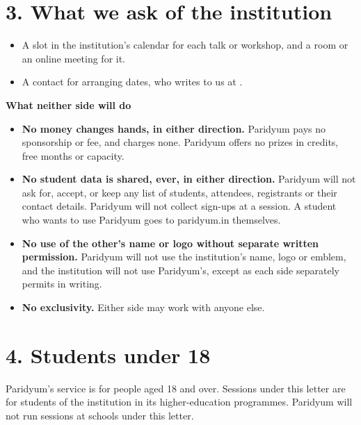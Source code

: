 \documentclass{paridyum}
\begin{document}
\section*{3. What we ask of the institution}
\begin{itemize}[leftmargin=*, noitemsep]
    \item A slot in the institution's calendar for each talk or workshop, and a room or an online
          meeting for it.
    \item A contact for arranging dates, who writes to us at \dkOrgEmail.
\end{itemize}

\vspace{0.5em}
\begin{infobox}
\textbf{What neither side will do}\\[0.5em]
\begin{itemize}[leftmargin=*, noitemsep]
    \item \textbf{No money changes hands, in either direction.} Paridyum pays no sponsorship or
          fee, and charges none. Paridyum offers no prizes in credits, free months or capacity.
    \item \textbf{No student data is shared, ever, in either direction.} Paridyum will not ask
          for, accept, or keep any list of students, attendees, registrants or their contact
          details. Paridyum will not collect sign-ups at a session. A student who wants to use
          Paridyum goes to paridyum.in themselves.
    \item \textbf{No use of the other's name or logo without separate written permission.}
          Paridyum will not use the institution's name, logo or emblem, and the institution will
          not use Paridyum's, except as each side separately permits in writing.
    \item \textbf{No exclusivity.} Either side may work with anyone else.
\end{itemize}
\end{infobox}

\section*{4. Students under 18}
Paridyum's service is for people aged 18 and over. Sessions under this letter are for students
of the institution in its higher-education programmes. Paridyum will not run sessions at
schools under this letter.
\end{document}
